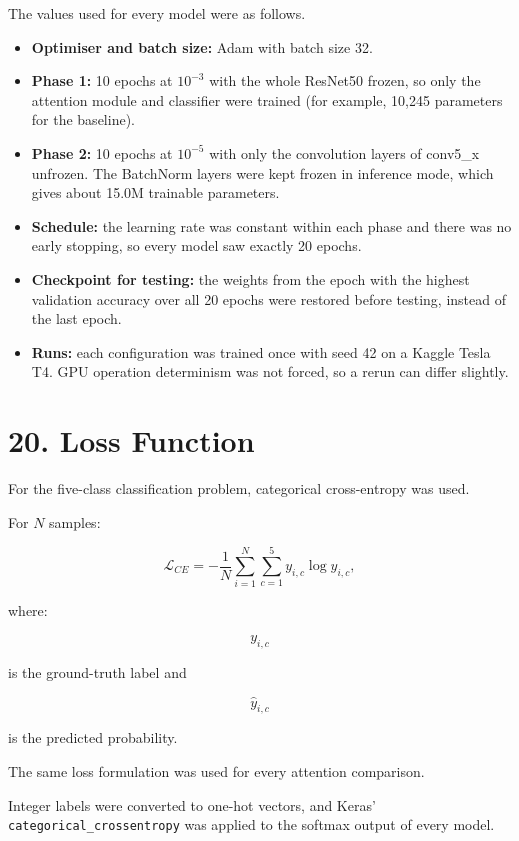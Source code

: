 \documentclass[10pt]{article}
\begin{document}
The values used for every model were as follows.
\begin{itemize}
\item \textbf{Optimiser and batch size:} Adam with batch size 32.
\item \textbf{Phase 1:} 10 epochs at $10^{-3}$ with the whole ResNet50 frozen, so
only the attention module and classifier were trained (for example, 10{,}245
parameters for the baseline).
\item \textbf{Phase 2:} 10 epochs at $10^{-5}$ with only the convolution layers of
conv5\_x unfrozen. The BatchNorm layers were kept frozen in inference mode, which
gives about 15.0M trainable parameters.
\item \textbf{Schedule:} the learning rate was constant within each phase and
there was no early stopping, so every model saw exactly 20 epochs.
\item \textbf{Checkpoint for testing:} the weights from the epoch with the highest
validation accuracy over all 20 epochs were restored before testing, instead of
the last epoch.
\item \textbf{Runs:} each configuration was trained once with seed 42 on a Kaggle
Tesla T4. GPU operation determinism was not forced, so a rerun can differ
slightly.
\end{itemize}

\section*{20. Loss Function}

For the five-class classification problem, categorical cross-entropy was used.

For $N$ samples:

\[
\mathcal{L}_{CE}
=
-
\frac{1}{N}
\sum_{i=1}^{N}
\sum_{c=1}^{5}
y_{i,c}
\log
\widehat{y}_{i,c},
\]

where:

\[
y_{i,c}
\]

is the ground-truth label and

\[
\widehat{y}_{i,c}
\]

is the predicted probability.

The same loss formulation was used for every attention comparison.

Integer labels were converted to one-hot vectors, and Keras'
\texttt{categorical\_crossentropy} was applied to the softmax output of every model.
\end{document}
